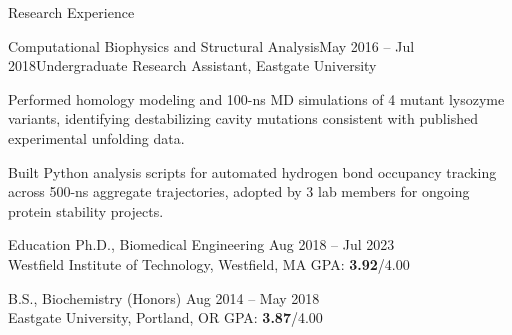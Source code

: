 \documentclass{resume}
\begin{document}
\begin{rSection}{Research Experience}
\begin{rSubsection}{Computational Biophysics and Structural Analysis}{\textcolor{black!60}{May 2016 -- Jul 2018}}{Undergraduate Research Assistant, Eastgate University}{}
\item Performed homology modeling and 100-ns MD simulations of 4 mutant lysozyme variants, identifying destabilizing cavity mutations consistent with published experimental unfolding data.
\item Built Python analysis scripts for automated hydrogen bond occupancy tracking across 500-ns aggregate trajectories, adopted by 3 lab members for ongoing protein stability projects.
\end{rSubsection}

\end{rSection}
\vspace{-0.15cm}

\begin{rSection}{Education}
{Ph.D., Biomedical Engineering} \hfill {\textcolor{black!60}{Aug 2018 -- Jul 2023}}\\
{Westfield Institute of Technology}, Westfield, MA \hfill GPA: \textbf{3.92}/4.00

{B.S., Biochemistry (Honors)} \hfill {\textcolor{black!60}{Aug 2014 -- May 2018}}\\
{Eastgate University}, Portland, OR \hfill GPA: \textbf{3.87}/4.00
\end{rSection}
\vspace{-0.15cm}
\end{document}
